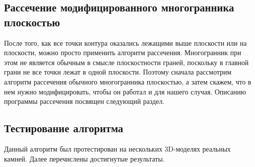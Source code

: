 \documentclass[a4paper,12pt, titlepage]{article}
\begin{document}
\subsection{Рассечение модифицированного многогранника плоскостью}
\begin{flushleft}
 После того, как все точки контура оказались лежащими выше плоскости или на плоскости, можно просто 
применить алгоритм рассечения. Многогранник при этом не является обычным в смысле плоскостности граней,
поскольку в главной грани не все точки лежат в одной плоскости. Поэтому сначала рассмотрим алгоритм
рассечения обычного многогранника плоскостью, а затем скажем, что в нем нужно модифицировать, чтобы он 
работал и для нашего случая. Описанию программы рассечения посвящен следующий раздел.
\end{flushleft}

\subsection{Тестирование алгоритма}
\begin{flushleft}
 Данный алгоритм был протестирован на нескольких 3D-моделях реальных камней. Далее перечислены 
достигнутые результаты.
\end{flushleft}
\end{document}
